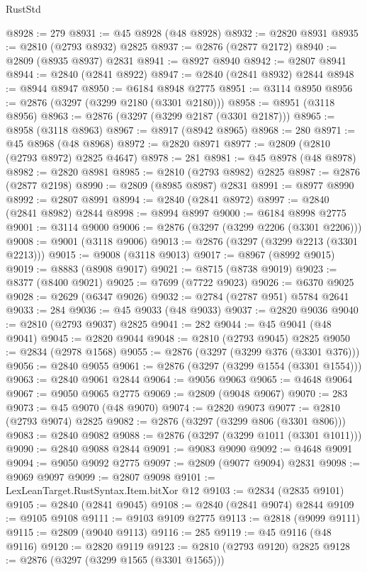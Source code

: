 \begin{lexlean}{RustStd}
\begin{coremodule}
@8928 := 279
@8931 := @45 @8928 (@48 @8928)
@8932 := @2820 @8931
@8935 := @2810 (@2793 @8932) @2825
@8937 := @2876 (@2877 @2172)
@8940 := @2809 (@8935 @8937) @2831
@8941 := @8927 @8940
@8942 := @2807 @8941
@8944 := @2840 (@2841 @8922)
@8947 := @2840 (@2841 @8932) @2844
@8948 := @8944 @8947
@8950 := @6184 @8948 @2775
@8951 := @3114 @8950
@8956 := @2876 (@3297 (@3299 @2180 (@3301 @2180)))
@8958 := @8951 (@3118 @8956)
@8963 := @2876 (@3297 (@3299 @2187 (@3301 @2187)))
@8965 := @8958 (@3118 @8963)
@8967 := @8917 (@8942 @8965)
@8968 := 280
@8971 := @45 @8968 (@48 @8968)
@8972 := @2820 @8971
@8977 := @2809 (@2810 (@2793 @8972) @2825 @4647)
@8978 := 281
@8981 := @45 @8978 (@48 @8978)
@8982 := @2820 @8981
@8985 := @2810 (@2793 @8982) @2825
@8987 := @2876 (@2877 @2198)
@8990 := @2809 (@8985 @8987) @2831
@8991 := @8977 @8990
@8992 := @2807 @8991
@8994 := @2840 (@2841 @8972)
@8997 := @2840 (@2841 @8982) @2844
@8998 := @8994 @8997
@9000 := @6184 @8998 @2775
@9001 := @3114 @9000
@9006 := @2876 (@3297 (@3299 @2206 (@3301 @2206)))
@9008 := @9001 (@3118 @9006)
@9013 := @2876 (@3297 (@3299 @2213 (@3301 @2213)))
@9015 := @9008 (@3118 @9013)
@9017 := @8967 (@8992 @9015)
@9019 := @8883 (@8908 @9017)
@9021 := @8715 (@8738 @9019)
@9023 := @8377 (@8400 @9021)
@9025 := @7699 (@7722 @9023)
@9026 := @6370 @9025
@9028 := @2629 (@6347 @9026)
@9032 := @2784 (@2787 @951) @5784 @2641
@9033 := 284
@9036 := @45 @9033 (@48 @9033)
@9037 := @2820 @9036
@9040 := @2810 (@2793 @9037) @2825
@9041 := 282
@9044 := @45 @9041 (@48 @9041)
@9045 := @2820 @9044
@9048 := @2810 (@2793 @9045) @2825
@9050 := @2834 (@2978 @1568)
@9055 := @2876 (@3297 (@3299 @376 (@3301 @376)))
@9056 := @2840 @9055
@9061 := @2876 (@3297 (@3299 @1554 (@3301 @1554)))
@9063 := @2840 @9061 @2844
@9064 := @9056 @9063
@9065 := @4648 @9064
@9067 := @9050 @9065 @2775
@9069 := @2809 (@9048 @9067)
@9070 := 283
@9073 := @45 @9070 (@48 @9070)
@9074 := @2820 @9073
@9077 := @2810 (@2793 @9074) @2825
@9082 := @2876 (@3297 (@3299 @806 (@3301 @806)))
@9083 := @2840 @9082
@9088 := @2876 (@3297 (@3299 @1011 (@3301 @1011)))
@9090 := @2840 @9088 @2844
@9091 := @9083 @9090
@9092 := @4648 @9091
@9094 := @9050 @9092 @2775
@9097 := @2809 (@9077 @9094) @2831
@9098 := @9069 @9097
@9099 := @2807 @9098
@9101 := LexLeanTarget.RustSyntax.Item.bitXor @12
@9103 := @2834 (@2835 @9101)
@9105 := @2840 (@2841 @9045)
@9108 := @2840 (@2841 @9074) @2844
@9109 := @9105 @9108
@9111 := @9103 @9109 @2775
@9113 := @2818 (@9099 @9111)
@9115 := @2809 (@9040 @9113)
@9116 := 285
@9119 := @45 @9116 (@48 @9116)
@9120 := @2820 @9119
@9123 := @2810 (@2793 @9120) @2825
@9128 := @2876 (@3297 (@3299 @1565 (@3301 @1565)))

\end{coremodule}
\end{lexlean}
